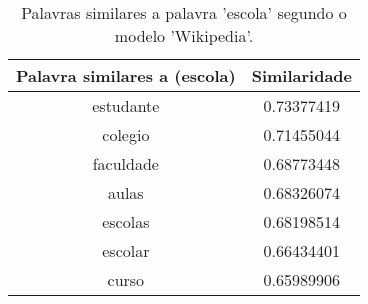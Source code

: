 \begin{table}[H]
\centering
\begin{tabular}{|c | c|}
 \hline
 Palavra similares a (escola) & Similaridade \\ [0.5ex]
 \hline
 estudante & 0.73377419 \\
 \hline
 colegio & 0.71455044 \\
 \hline
 faculdade & 0.68773448 \\
 \hline
 aulas & 0.68326074 \\
 \hline
 escolas & 0.68198514 \\
 \hline
 escolar & 0.66434401 \\
 \hline
 curso & 0.65989906 \\
 \hline
\end{tabular}
\caption{Palavras similares a palavra 'escola' segundo o modelo 'Wikipedia'.}
\label{table:1}
\end{table}


